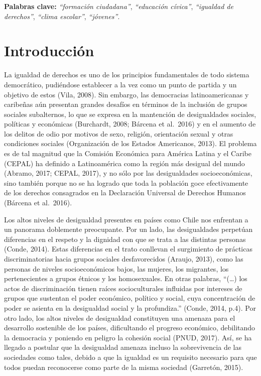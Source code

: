 \documentclass[12pt,twoside]{templates/facsothesis}
\begin{document}
\textbf{Palabras clave:} \emph{``formación ciudadana''}, \emph{``educación cívica''}, \emph{``igualdad de derechos''}, \emph{``clima escolar''}, \emph{``jóvenes''}.

\hypertarget{introducciuxf3n}{%
\chapter{Introducción}\label{introducciuxf3n}}

La igualdad de derechos es uno de los principios fundamentales de todo sistema democrático, pudiéndose establecer a la vez como un punto de partida y un objetivo de estos (Vila, 2008). Sin embargo, las democracias latinoamericanas y caribeñas aún presentan grandes desafíos en términos de la inclusión de grupos sociales subalternos, lo que se expresa en la mantención de desigualdades sociales, políticas y económicas (Burchardt, 2008; Bárcena et al.~2016) y en el aumento de los delitos de odio por motivos de sexo, religión, orientación sexual y otras condiciones sociales (Organización de los Estados Americanos, 2013). El problema es de tal magnitud que la Comisión Económica para América Latina y el Caribe (CEPAL) ha definido a Latinoamérica como la región más desigual del mundo (Abramo, 2017; CEPAL, 2017), y no sólo por las desigualdades socioeconómicas, sino también porque no se ha logrado que toda la población goce efectivamente de los derechos consagrados en la Declaración Universal de Derechos Humanos (Bárcena et al.~2016).

Los altos niveles de desigualdad presentes en países como Chile nos enfrentan a un panorama doblemente preocupante. Por un lado, las desigualdades perpetúan diferencias en el respeto y la dignidad con que se trata a las distintas personas (Conde, 2014). Estas diferencias en el trato conllevan el surgimiento de prácticas discriminatorias hacia grupos sociales desfavorecidos (Araujo, 2013), como las personas de niveles socioeconómicos bajos, las mujeres, los migrantes, los pertenecientes a grupos étnicos y los homosexuales. En otras palabras, ``(\ldots) los actos de discriminación tienen raíces socioculturales influidas por intereses de grupos que sustentan el poder económico, político y social, cuya concentración de poder se asienta en la desigualdad social y la profundiza.'' (Conde, 2014, p.4). Por otro lado, los altos niveles de desigualdad constituyen una amenaza para el desarrollo sostenible de los países, dificultando el progreso económico, debilitando la democracia y poniendo en peligro la cohesión social (PNUD, 2017). Así, se ha llegado a postular que la desigualdad amenaza incluso la sobrevivencia de las sociedades como tales, debido a que la igualdad es un requisito necesario para que todos puedan reconocerse como parte de la misma sociedad (Garretón, 2015).
\end{document}
